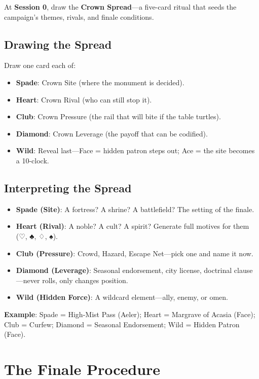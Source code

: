 At \textbf{Session 0}, draw the \textbf{Crown Spread}---a five-card ritual that seeds the campaign's themes, rivals, and finale conditions.

\subsection*{Drawing the Spread}

Draw one card each of:

\begin{itemize}
    \item \textbf{Spade}: Crown Site (where the monument is decided).
    \item \textbf{Heart}: Crown Rival (who can still stop it).
    \item \textbf{Club}: Crown Pressure (the rail that will bite if the table turtles).
    \item \textbf{Diamond}: Crown Leverage (the payoff that can be codified).
    \item \textbf{Wild}: Reveal last---Face = hidden patron steps out; Ace = the site becomes a 10-clock.
\end{itemize}

\subsection*{Interpreting the Spread}

\begin{itemize}
    \item \textbf{Spade (Site)}: A fortress? A shrine? A battlefield? The setting of the finale.
    \item \textbf{Heart (Rival)}: A noble? A cult? A spirit? Generate full motives for them (♡, ♣, ♢, ♠).
    \item \textbf{Club (Pressure)}: Crowd, Hazard, Escape Net---pick one and name it now.
    \item \textbf{Diamond (Leverage)}: Seasonal endorsement, city license, doctrinal clause---never rolls, only changes position.
    \item \textbf{Wild (Hidden Force)}: A wildcard element---ally, enemy, or omen.
\end{itemize}

\textbf{Example}: Spade = High-Mist Pass (Aeler); Heart = Margrave of Acasia (Face); Club = Curfew; Diamond = Seasonal Endorsement; Wild = Hidden Patron (Face).

\section*{The Finale Procedure}

